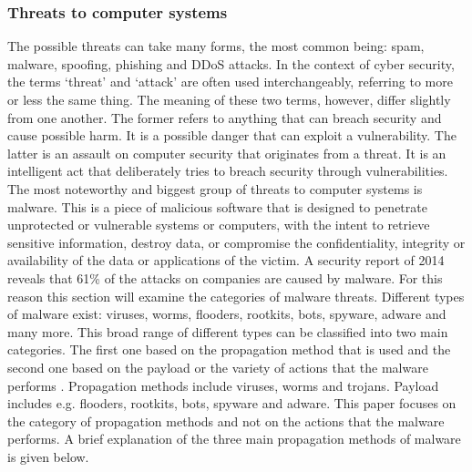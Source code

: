 \subsubsection{Threats to computer systems}


The possible threats can take many forms, the most common being: spam, malware, spoofing, phishing and  DDoS attacks.  In the context of cyber security, the terms `threat'  and `attack' are often used interchangeably, referring to more or less the same thing. The meaning of these two terms, however, differ slightly from one another. The former refers to anything that can breach security and cause possible harm. It is a possible danger that can exploit a vulnerability. The latter is an assault on computer security that originates from a threat. It is an intelligent act that deliberately tries to breach security through vulnerabilities.  \\

The most noteworthy and biggest group of threats to computer systems is malware. 
This is a piece of malicious software that is designed to penetrate unprotected or vulnerable systems or computers, with the intent to retrieve sensitive information, destroy data, or compromise the confidentiality, integrity or availability of the data or applications of the victim. A security report of 2014 \cite{SurveyKaspersky} reveals that 61\% of the attacks on companies are caused by malware. For this reason this section will examine the categories of malware threats. Different types of malware exist: viruses, worms, flooders, rootkits, bots, spyware, adware and many more. This broad range of different types can be classified into two main categories. The first one based on the propagation method that is used and the second one based on the payload or the variety of actions that the malware performs \cite{stallings2007network}. Propagation methods include viruses, worms and trojans. Payload includes e.g. flooders, rootkits, bots, spyware and adware. This paper focuses on the category of propagation methods and not on the actions that the malware performs. A brief explanation of the three main propagation methods of malware is given below.  


